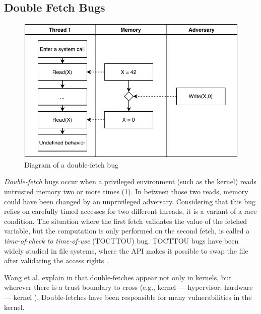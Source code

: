 \subsection{Double Fetch Bugs}
\label{subsec:doublefetch}

\begin{figure}[]
  \centering
  \includegraphics[width=.85\linewidth]{img/doublefetch.pdf}
  \caption{Diagram of a double-fetch bug}
  \label{fig:doublefetch}
\end{figure}

\emph{Double-fetch} bugs occur when a privileged environment (such as the 
kernel) reads untrusted memory two or more times
(\cref{fig:doublefetch}). 
In between those two reads, memory could have been changed by an unprivileged
adversary. Considering that this bug relies on carefully timed accesses
for two different threads, it is a variant of a race condition. The situation
where the first fetch validates the value of the fetched variable, 
but the computation is only performed on the second fetch, is called a 
\emph{time-of-check to time-of-use} (TOCTTOU) bug. TOCTTOU bugs have been
widely studied in file systems, where the API makes it possible to swap the file
after validating the access rights \cite{payer2012protecting,
pu2006methodical, wei2010modeling, tsafrir2008portably}.


Wang et al. explain in \cite{wang2018survey} that double-fetches appear not only
in kernels, but wherever there is a trust boundary to cross (e.g., kernel --- 
hypervisor, hardware --- kernel ). Double-fetches have been responsible for many
vulnerabilities in the kernel. 

